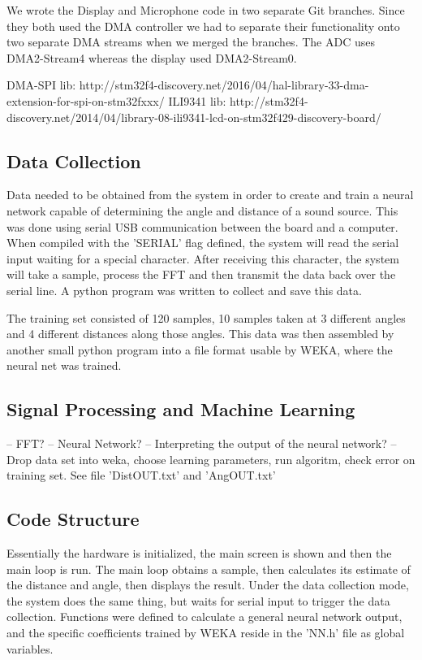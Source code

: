 \documentclass[twoside]{article}
\begin{document}
\begin{multicols}{2}
We wrote the Display and Microphone code in two separate Git branches. Since they both used the DMA controller we had to separate their functionality onto two separate DMA streams when we merged the branches. The ADC uses DMA2-Stream4 whereas the display used DMA2-Stream0.

DMA-SPI lib: http://stm32f4-discovery.net/2016/04/hal-library-33-dma-extension-for-spi-on-stm32fxxx/
ILI9341 lib: http://stm32f4-discovery.net/2014/04/library-08-ili9341-lcd-on-stm32f429-discovery-board/

\subsection{Data Collection}
Data needed to be obtained from the system in order to create and train a neural network capable of determining the angle and distance of a sound source. This was done using serial USB communication between the board and a computer. When compiled with the 'SERIAL' flag defined, the system will read the serial input waiting for a special character. After receiving this character, the system will take a sample, process the FFT and then transmit the data back over the serial line. A python program was written to collect and save this data.

The training set consisted of 120 samples, 10 samples taken at 3 different angles and 4 different distances along those angles. This data was then assembled by another small python program into a file format usable by WEKA, where the neural net was trained.

\subsection{Signal Processing and Machine Learning}
-- FFT?
-- Neural Network?
-- Interpreting the output of the neural network?
-- Drop data set into weka, choose learning parameters, run algoritm, check error on training set. See file 'DistOUT.txt' and 'AngOUT.txt'

\subsection{Code Structure}
Essentially the hardware is initialized, the main screen is shown and then the main loop is run. The main loop obtains a sample, then calculates its estimate of the distance and angle, then displays the result. Under the data collection mode, the system does the same thing, but waits for serial input to trigger the data collection. Functions were defined to calculate a general neural network output, and the specific coefficients trained by WEKA reside in the 'NN.h' file as global variables.


\end{multicols}
\end{document}
